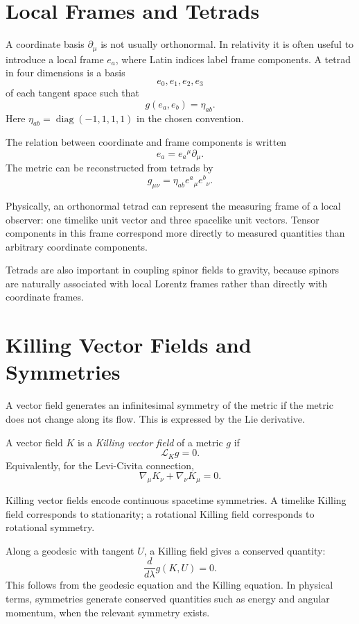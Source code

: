 \clearpage

\section{Local Frames and Tetrads}

A coordinate basis \(\partial_\mu\) is not usually orthonormal. In relativity it
is often useful to introduce a local frame \(e_a\), where Latin indices label
frame components. A tetrad in four dimensions is a basis
\[
e_0,e_1,e_2,e_3
\]
of each tangent space such that
\[
g(e_a,e_b)=\eta_{ab}.
\]
Here \(\eta_{ab}=\operatorname{diag}(-1,1,1,1)\) in the chosen convention.

The relation between coordinate and frame components is written
\[
e_a=e_a{}^\mu\partial_\mu.
\]
The metric can be reconstructed from tetrads by
\[
g_{\mu\nu}=\eta_{ab}e^a{}_{\mu}e^b{}_{\nu}.
\]

Physically, an orthonormal tetrad can represent the measuring frame of a local
observer: one timelike unit vector and three spacelike unit vectors. Tensor
components in this frame correspond more directly to measured quantities than
arbitrary coordinate components.

Tetrads are also important in coupling spinor fields to gravity, because spinors
are naturally associated with local Lorentz frames rather than directly with
coordinate frames.

\clearpage

\section{Killing Vector Fields and Symmetries}

A vector field generates an infinitesimal symmetry of the metric if the metric
does not change along its flow. This is expressed by the Lie derivative.

\begin{definitionbox}
A vector field \(K\) is a \emph{Killing vector field} of a metric \(g\) if
\[
\mathcal{L}_K g=0.
\]
Equivalently, for the Levi-Civita connection,
\[
\nabla_\mu K_\nu+\nabla_\nu K_\mu=0.
\]
\end{definitionbox}

Killing vector fields encode continuous spacetime symmetries. A timelike Killing
field corresponds to stationarity; a rotational Killing field corresponds to
rotational symmetry.

Along a geodesic with tangent \(U\), a Killing field gives a conserved quantity:
\[
\frac{d}{d\lambda}g(K,U)=0.
\]
This follows from the geodesic equation and the Killing equation. In physical
terms, symmetries generate conserved quantities such as energy and angular
momentum, when the relevant symmetry exists.


